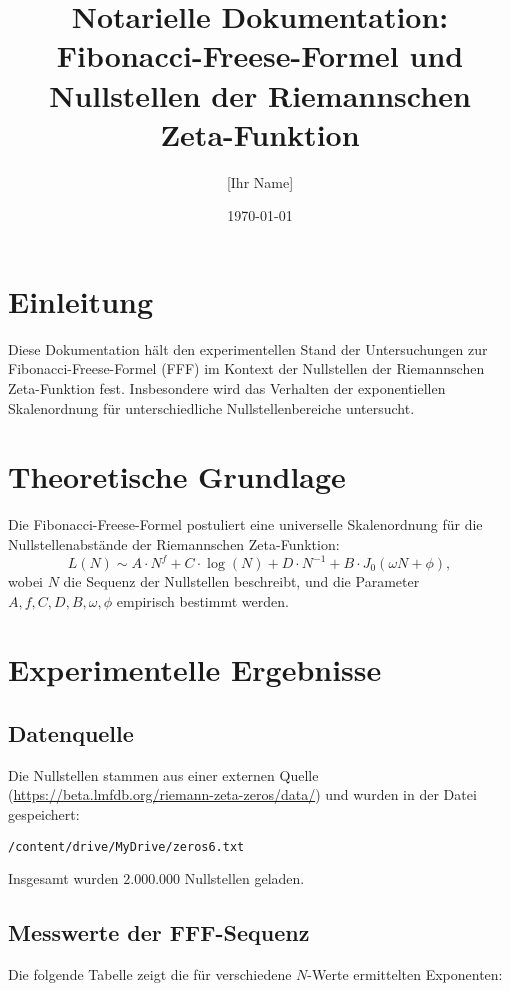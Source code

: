 \documentclass[a4paper,12pt]{article}
\title{Notarielle Dokumentation: Fibonacci-Freese-Formel und Nullstellen der Riemannschen Zeta-Funktion}
\author{[Ihr Name]}
\date{\today}
\begin{document}
\maketitle

\section{Einleitung}
Diese Dokumentation hält den experimentellen Stand der Untersuchungen zur Fibonacci-Freese-Formel (FFF) im Kontext der Nullstellen der Riemannschen Zeta-Funktion fest. Insbesondere wird das Verhalten der exponentiellen Skalenordnung für unterschiedliche Nullstellenbereiche untersucht.

\section{Theoretische Grundlage}
Die Fibonacci-Freese-Formel postuliert eine universelle Skalenordnung für die Nullstellenabstände der Riemannschen Zeta-Funktion:
\begin{equation}
L(N) \sim A \cdot N^f + C \cdot \log(N) + D \cdot N^{-1} + B \cdot J_0(\omega N + \phi),
\end{equation}
wobei $N$ die Sequenz der Nullstellen beschreibt, und die Parameter $A, f, C, D, B, \omega, \phi$ empirisch bestimmt werden.

\section{Experimentelle Ergebnisse}

\subsection{Datenquelle}
Die Nullstellen stammen aus einer externen Quelle (\url{https://beta.lmfdb.org/riemann-zeta-zeros/data/}) und wurden in der Datei gespeichert:

\begin{verbatim}
/content/drive/MyDrive/zeros6.txt
\end{verbatim}

Insgesamt wurden $2.000.000$ Nullstellen geladen.

\subsection{Messwerte der FFF-Sequenz}

Die folgende Tabelle zeigt die für verschiedene $N$-Werte ermittelten Exponenten:
\end{document}

